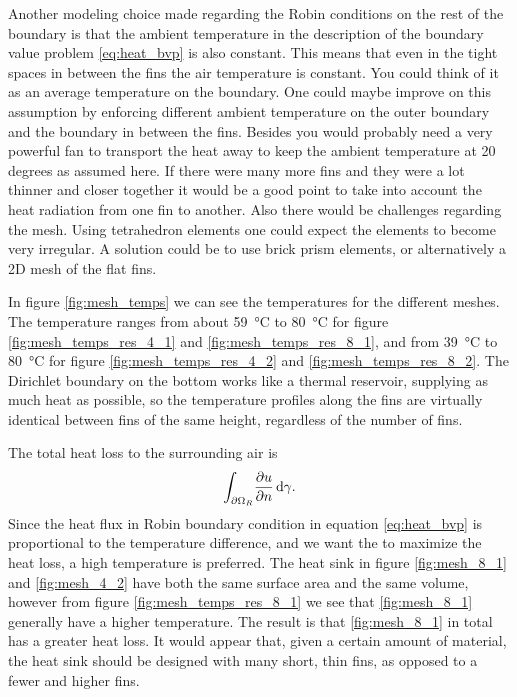 Another modeling choice made regarding the Robin conditions on the rest of the boundary is that the ambient temperature in the description of the boundary value problem \eqref{eq:heat_bvp} is also constant. This means that even in the tight spaces in between the fins the air temperature is constant. You could think of it as an average temperature on the boundary. One could maybe improve on this assumption by enforcing different ambient temperature on the outer boundary and the boundary in between the fins. Besides you would probably need a very powerful fan to transport the heat away to keep the ambient temperature at 20 degrees as assumed here.
If there were many more fins and they were a lot thinner and closer together it would be a good point to take into account the heat radiation from one fin to another. Also there would be challenges regarding the mesh. Using tetrahedron elements one could expect the elements to become very irregular. A solution could be to use brick prism elements, or alternatively a 2D mesh of the flat fins.

In figure \ref{fig:mesh_temps} we can see the temperatures for the different meshes. The temperature ranges from about \SI{59}{\celsius} to \SI{80}{\celsius} for figure \ref{fig:mesh_temps_res_4_1} and \ref{fig:mesh_temps_res_8_1}, and from \SI{39}{\celsius} to \SI{80}{\celsius} for figure \ref{fig:mesh_temps_res_4_2} and \ref{fig:mesh_temps_res_8_2}. The Dirichlet boundary on the bottom works like a thermal reservoir, supplying as much heat as possible, so the temperature profiles along the fins are virtually identical between fins of the same height, regardless of the number of fins.

The total heat loss to the surrounding air is
\begin{equation}
    \int_{\partial\Omega_R}\! \pdv{u}{n}\, \mathrm{d}{\gamma}.
\end{equation}
Since the heat flux in Robin boundary condition in equation \eqref{eq:heat_bvp} is proportional to the temperature difference, and we want the to maximize the heat loss, a high temperature is preferred. The heat sink in figure \ref{fig:mesh_8_1} and \ref{fig:mesh_4_2} have both the same surface area and the same volume,  however from figure \ref{fig:mesh_temps_res_8_1} we see that \ref{fig:mesh_8_1} generally have a higher temperature. The result is that \ref{fig:mesh_8_1} in total has a greater heat loss. It would appear that, given a certain amount of material, the heat sink should be designed with many short, thin fins, as opposed to a fewer and higher fins.